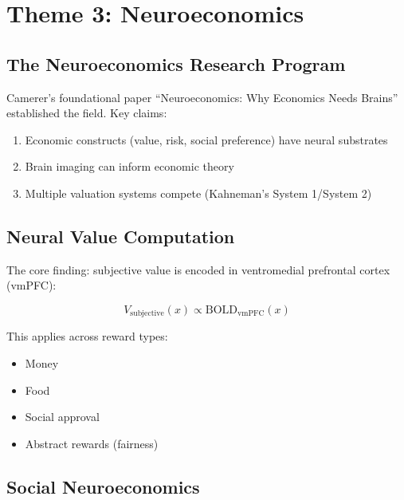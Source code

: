 \section{Theme 3: Neuroeconomics}
\label{sec:ca-neuro}

\subsection{The Neuroeconomics Research Program}

Camerer's foundational paper ``Neuroeconomics: Why Economics Needs Brains'' \citep{camerer2004neuroeconomicsneuroeconomics} established the field. Key claims:

\begin{enumerate}[nosep]
\item Economic constructs (value, risk, social preference) have neural substrates
\item Brain imaging can inform economic theory
\item Multiple valuation systems compete (Kahneman's System 1/System 2)
\end{enumerate}

\subsection{Neural Value Computation}

The core finding: subjective value is encoded in ventromedial prefrontal cortex (vmPFC):

\begin{equation}
V_{\text{subjective}}(x) \propto \text{BOLD}_{\text{vmPFC}}(x)
\end{equation}

This applies across reward types:
\begin{itemize}[nosep]
\item Money
\item Food
\item Social approval
\item Abstract rewards (fairness)
\end{itemize}

\subsection{Social Neuroeconomics}

